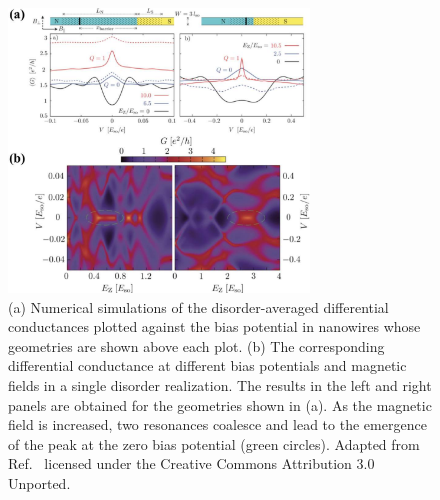 \documentclass{tADP2e}
\theoremstyle{plain}
\theoremstyle{plain}
\theoremstyle{definition}
\begin{document}
\begin{figure}[t]
\begin{center}
\includegraphics[width=8cm]{./Figures/fig_4_rmtdot.pdf}
\end{center}
\caption{(a) Numerical simulations of the disorder-averaged differential conductances plotted against the bias potential in nanowires whose geometries  are shown above each plot.  
(b) The corresponding differential conductance at different bias potentials and magnetic fields in a single disorder realization. The results in the left and right panels are obtained for the geometries shown in (a). As the magnetic field is increased, two resonances coalesce and lead to the emergence of the peak at the zero bias potential (green circles). 
Adapted from Ref.~\cite{Pikulin_2012} licensed under the Creative Commons Attribution 3.0 Unported. 
}
\label{fig:4rmtdot}
\end{figure}
\end{document}
